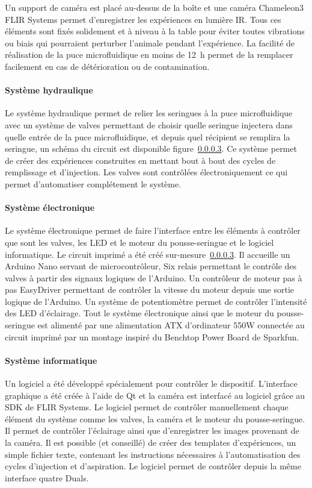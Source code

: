   \medbreak
  Un support de caméra est placé au-dessus de la boîte et une caméra Chameleon3 FLIR Systems permet d'enregistrer les expériences en lumière IR.
  \medbreak
  Tous ces éléments sont fixés solidement et à niveau à la table pour éviter toutes vibrations ou biais qui pourraient perturber l'animale pendant l'expérience. La facilité de réalisation de la puce microfluidique en moins de 12 h permet de la remplacer facilement en cas de détérioration ou de contamination.
  \paragraph{Système hydraulique}
  Le système hydraulique permet de relier les seringues à la puce microfluidique avec un système de valves permettant de choisir quelle seringue injectera dans quelle entrée de la puce microfluidique, et depuis quel récipient se remplira la seringue, un schéma du circuit est disponible figure~\ref{}. Ce système permet de créer des expériences construites en mettant bout à bout des cycles de remplissage et d'injection. Les valves sont contrôlées électroniquement ce qui permet d'automatiser complétement le système.
  \paragraph{Système électronique}
  Le système électronique permet de faire l'interface entre les éléments à contrôler que sont les valves, les LED et le moteur du pousse-seringue et le logiciel informatique. Le circuit imprimé a été créé sur-mesure~\ref{}. Il accueille un Arduino Nano servant de microcontrôleur, Six relais permettant le contrôle des valves à partir des signaux logiques de l'Arduino. Un contrôleur de moteur pas à pas EasyDriver permettant de contrôler la vitesse du moteur depuis une sortie logique de l'Arduino. Un système de potentiomètre permet de contrôler l'intensité des LED d'éclairage. Tout le système électronique ainsi que le moteur du pousse-seringue est alimenté par une alimentation ATX d'ordinateur 550W connectée au circuit imprimé par un montage inspiré du Benchtop Power Board de Sparkfun.
  \paragraph{Système informatique}
  Un logiciel a été développé spécialement pour contrôler le dispositif. L'interface graphique a été créée à l'aide de Qt et la caméra est interfacé au logiciel grâce au SDK de FLIR Systems. Le logiciel permet de contrôler manuellement chaque élément du système comme les valves, la caméra et le moteur du pousse-seringue. Il permet de contrôler l'éclairage ainsi que d'enregistrer les images provenant de la caméra. Il est possible (et conseillé) de créer des templates d'expériences, un simple fichier texte, contenant les instructions nécessaires à l'automatisation des cycles d'injection et d'aspiration. Le logiciel permet de contrôler depuis la même interface quatre Duals.

